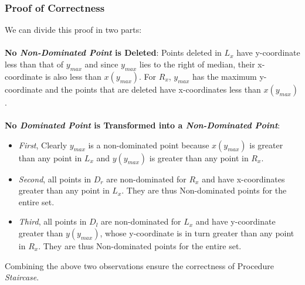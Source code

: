\documentclass{article}
\begin{document}
\subsubsection{Proof of Correctness}
We can divide this proof in two parts:\\ \\
\textbf{No \emph{Non-Dominated Point} is Deleted}: Points deleted in $L_x$ have y-coordinate less than that of $y_{max}$ and since $y_{max}$ lies to the right of median, their x-coordinate is also less than $x(y_{max})$. For $R_x$, $y_{max}$ has the maximum y-coordinate and the points that are deleted have x-coordinates less than $x(y_{max})$.\\ \\
\textbf{No \emph{Dominated Point} is Transformed into a \emph{Non-Dominated Point}}:
\begin{itemize}
\item \emph{First}, Clearly $y_{max}$ is a non-dominated point because $x(y_{max})$ is greater than any point in $L_x$ and $y(y_{max})$ is greater than any point in $R_x$. 
\item \emph{Second}, all points in $D_r$ are non-dominated for $R_x$ and have x-coordinates greater than any point in $L_x$. They are thus Non-dominated points for the entire set.
\item \emph{Third}, all points in $D_l$ are non-dominated for $L_x$ and have y-coordinate greater than $y(y_{max})$, whose y-coordinate is in turn greater than any point in $R_x$.  They are thus Non-dominated points for the entire set. \\
\end{itemize}

Combining the above two observations ensure the correctness of Procedure \emph{Staircase}.
\end{document}
